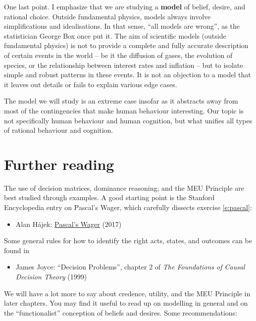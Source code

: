 One last point. I emphasize that we are studying a \textbf{model} of
belief, desire, and rational choice. Outside fundamental physics,
models always involve simplifications and idealisations. In that
sense, ``all models are wrong'', as the statistician George Box once
put it. The aim of scientific models (outside fundamental physics) is
not to provide a complete and fully accurate description of certain
events in the world -- be it the diffusion of gases, the evolution of
species, or the relationship between interest rates and inflation --
but to isolate simple and robust patterns in these events. It is not
an objection to a model that it leaves out details or fails to explain
various edge cases.

The model we will study is an extreme case insofar as it abstracts
away from most of the contingencies that make human behaviour
interesting. Our topic is not specifically human behaviour and human
cognition, but what unifies all types of rational behaviour and
cognition.

\section{Further reading}

The use of decision matrices, dominance reasoning, and the MEU
Principle are best studied through examples. A good starting point is
the Stanford Encyclopedia entry on Pascal's Wager, which carefully
dissects exercise \ref{e:pascal}:

\begin{itemize}
\item Alan H\'ajek: \href{http://plato.stanford.edu/entries/pascal-wager/}{Pascal's Wager} (2017)
\end{itemize}

Some general rules for how to identify the right acts, states, and
outcomes can be found in

\begin{itemize}
\item James Joyce: ``Decision Problems'', chapter 2 of \emph{The
    Foundations of Causal Decision Theory} (1999)
\end{itemize}

We will have a lot more to say about credence, utility, and the MEU
Principle in later chapters. You may find it useful to read up on
modelling in general and on the ``functionalist'' conception of
beliefs and desires. Some recommendations:

